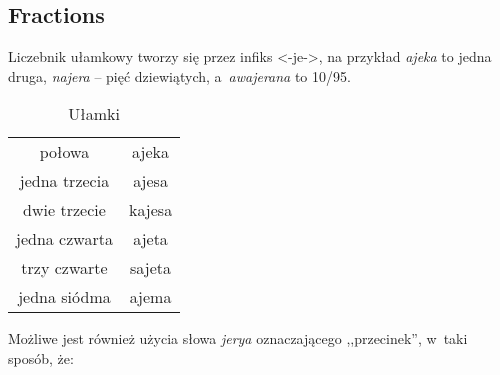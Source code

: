 \subsection{Fractions}

Liczebnik ułamkowy tworzy się przez infiks <-je->, na przykład \emph{ajeka} to
jedna druga, \emph{najera} -- pięć dziewiątych, a~\emph{awajerana} to 10/95.

\begin{table}[ht]
  \centering
  \caption{Ułamki}
  \begin{tabular}{cc} \toprule
    połowa        & ajeka  \\
    jedna trzecia & ajesa  \\
    dwie trzecie  & kajesa \\
    jedna czwarta & ajeta  \\
    trzy czwarte  & sajeta \\
    jedna siódma  & ajema  \\\bottomrule
  \end{tabular}
  \label{tab:numerals4}
\end{table}

Możliwe jest również użycia słowa \emph{jerya} oznaczającego ,,przecinek'',
w~taki sposób, że:


